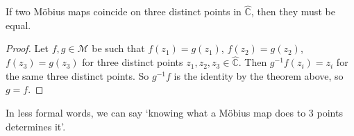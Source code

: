 \begin{corollary}
	If two M\"obius maps coincide on three distinct points in \(\hat{\mathbb C}\), then they must be equal.
\end{corollary}
\begin{proof}
	Let \(f, g \in \mathcal M\) be such that \(f(z_1) = g(z_1)\), \(f(z_2) = g(z_2)\), \(f(z_3) = g(z_3)\) for three distinct points \(z_1, z_2, z_3 \in \hat{\mathbb C}\). Then \(g^{-1}f(z_i) = z_i\) for the same three distinct points. So \(g^{-1}f\) is the identity by the theorem above, so \(g = f\).
\end{proof}
In less formal words, we can say `knowing what a M\"obius map does to 3 points determines it'.

